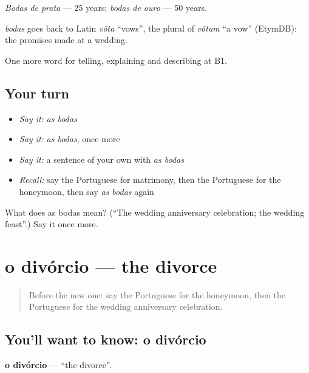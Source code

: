 \emph{Bodas de prata} — 25 years; \emph{bodas de ouro} — 50 years.

\begin{cousinweb}
\emph{bodas} goes back to Latin \emph{vōta} \textquotedblleft{}vows\textquotedblright{}, the plural of \emph{vōtum} \textquotedblleft{}a vow\textquotedblright{} (EtymDB): the promises made at a wedding.
\end{cousinweb}

\begin{grammarlens}[title={What you've built}]
One more word for telling, explaining and describing at B1.
\end{grammarlens}

\subsection*{Your turn}
\begin{itemize}
\raggedright
  \item \emph{Say it:} \emph{as bodas}
  \item \emph{Say it:} \emph{as bodas}, once more
  \item \emph{Say it:} a sentence of your own with \emph{as bodas}
  \item \emph{Recall:} say the Portuguese for matrimony, then the Portuguese for the honeymoon, then say \emph{as bodas} again
\end{itemize}

\begin{tcolorbox}[breakable,colback=teal!4,colframe=teal!35!black,title={Before you move on}]
What does as bodas mean? (\textquotedblleft{}The wedding anniversary celebration; the wedding feast\textquotedblright{}.) Say it once more.
\end{tcolorbox}
\section[o divórcio]{o divórcio — the divorce}

\label{lesson:PT-C313-divorcio}



\begin{quote}
Before the new one: say the Portuguese for the honeymoon, then the Portuguese for the wedding anniversary celebration.
\end{quote}

\subsection*{You'll want to know: o divórcio}
\textbf{o divórcio} — \textquotedblleft{}the divorce\textquotedblright{}.

